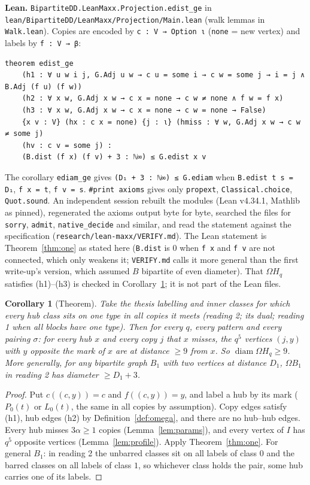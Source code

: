 \documentclass[11pt]{amsart}
\newcommand{\file}[1]{\nolinkurl{#1}}
\theoremstyle{plain}
\newtheorem{corollary}[lemma]{Corollary}
\theoremstyle{definition}
\theoremstyle{remark}
\newcommand{\Om}{\Omega}
\begin{document}
\noindent\textbf{Lean.} \file{BipartiteDD.LeanMaxx.Projection.edist_ge} in
\file{lean/BipartiteDD/LeanMaxx/Projection/Main.lean} (walk lemmas in \file{Walk.lean}). Copies are encoded by
\texttt{c : V → Option ι} (\texttt{none} = new vertex) and labels by \texttt{f : V → β}:
\begin{Verbatim}[fontsize=\small,frame=single,framesep=2mm]
theorem edist_ge
    (h1 : ∀ u w i j, G.Adj u w → c u = some i → c w = some j → i = j ∧ B.Adj (f u) (f w))
    (h2 : ∀ x w, G.Adj x w → c x = none → c w ≠ none ∧ f w = f x)
    (h3 : ∀ x w, G.Adj x w → c x = none → c w = none → False)
    {x v : V} (hx : c x = none) {j : ι} (hmiss : ∀ w, G.Adj x w → c w ≠ some j)
    (hv : c v = some j) :
    (B.dist (f x) (f v) + 3 : ℕ∞) ≤ G.edist x v
\end{Verbatim}
The corollary \file{ediam_ge} gives \texttt{(D₁ + 3 : ℕ∞) ≤ G.ediam} when \texttt{B.edist t s = D₁},
\texttt{f x = t}, \texttt{f v = s}. \texttt{\#print axioms} gives only \texttt{propext}, \file{Classical.choice},
\file{Quot.sound}. An independent session rebuilt the modules (Lean v4.34.1, Mathlib as pinned), regenerated the
axioms output byte for byte, searched the files for \texttt{sorry}, \texttt{admit}, \file{native_decide} and
similar, and read the statement against the specification (\file{research/lean-maxx/VERIFY.md}). The Lean statement is
Theorem~\ref{thm:one} as stated here (\file{B.dist} is $0$ when \texttt{f x} and \texttt{f v} are not connected, which
only weakens it; \file{VERIFY.md} calls it more general than the first write-up's version, which assumed $B$ bipartite
of even diameter). That $\Om H_q$
satisfies (h1)--(h3) is checked in Corollary~\ref{cor:one}; it is not part of the Lean files.

\begin{corollary}[Theorem]\label{cor:one}
Take the thesis labelling and inner classes for which every hub class sits on one type in all copies it meets (reading 2;
its dual; reading 1 when all blocks have one type). Then for every $q$, every pattern and every pairing $\sigma$: for
every hub $x$ and every copy $j$ that $x$ misses, the $q^5$ vertices $(j,y)$ with $y$ opposite the mark of $x$ are at
distance $\ge 9$ from $x$. So $\operatorname{diam} \Om H_q \ge 9$. More generally, for any bipartite graph $B_1$ with two
vertices at distance $D_1$, $\Om B_1$ in reading 2 has diameter $\ge D_1 + 3$.
\end{corollary}

\begin{proof}
Put $c((c,y)) = c$ and $f((c,y)) = y$, and label a hub by its mark ($P_0(t)$ or $L_0(t)$, the same in all copies by
assumption). Copy edges satisfy (h1), hub edges (h2) by Definition~\ref{def:omega}, and there are no hub--hub edges. Every
hub misses $3\alpha \ge 1$ copies (Lemma~\ref{lem:params}), and every vertex of $I$ has $q^5$ opposite vertices
(Lemma~\ref{lem:profile}). Apply Theorem~\ref{thm:one}. For general $B_1$: in reading 2 the unbarred classes sit on all
labels of class $0$ and the barred classes on all labels of class $1$, so whichever class holds the pair, some hub
carries one of its labels.
\end{proof}
\end{document}
